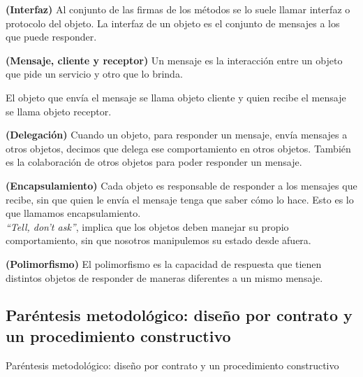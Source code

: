 \documentclass[../main.tex]{subfiles}
\begin{document}
        \begin{definition} \textbf{(Interfaz)}
            Al conjunto de las firmas de los métodos se lo suele llamar interfaz o protocolo del objeto. La interfaz de un objeto es el conjunto de mensajes a los que puede responder.
        \end{definition}

        \begin{definition} \textbf{(Mensaje, cliente y receptor)}
            Un mensaje es la interacción entre un objeto que pide un servicio y otro que lo brinda.

            El objeto que envía el mensaje se llama objeto cliente y quien recibe el mensaje se llama objeto receptor.
            
        \end{definition}

        \begin{definition} \textbf{(Delegación)}
            Cuando un objeto, para responder un mensaje, envía mensajes a otros objetos, decimos que delega ese comportamiento en otros objetos. También es la colaboración de otros objetos para poder responder un mensaje.
        \end{definition}

        \begin{definition} \textbf{(Encapsulamiento)}
            Cada objeto es responsable de responder a los mensajes que recibe, sin que quien le envía el mensaje tenga que saber cómo lo hace. Esto es lo que llamamos encapsulamiento.\\

            \textit{“Tell, don’t ask”}, implica que los objetos deben manejar su propio comportamiento, sin que nosotros manipulemos su estado desde afuera.
        \end{definition}

        \begin{definition} \textbf{(Polimorfismo)}
            El polimorfismo es la capacidad de respuesta que tienen distintos objetos de responder de maneras diferentes a un mismo mensaje.
        \end{definition}



    \subsection{Paréntesis metodológico: diseño por contrato y un procedimiento constructivo}
        Paréntesis metodológico: diseño por contrato y un procedimiento constructivo
\end{document}
